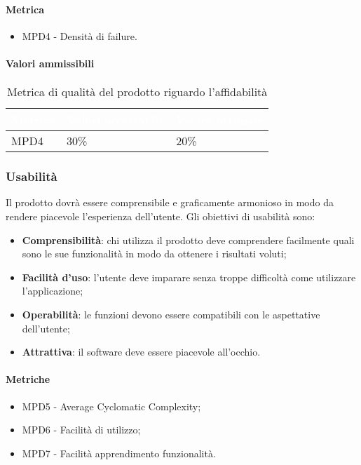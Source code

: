 \paragraph{Metrica}
\begin{itemize}
\item MPD4 - Densità di failure.
\end{itemize}
\paragraph{Valori ammissibili}
\renewcommand{\arraystretch}{1.5}
\begin{longtable}{C{2.5cm} C{4cm} C{4cm}}
\textcolor{white}{\textbf{Metrica}}&
\textcolor{white}{\textbf{Valori accettabile}}&
\textcolor{white}{\textbf{Valore ottimale}}\\	
\endhead
\endfoot
{}\caption{Metrica di qualità del prodotto riguardo l'affidabilità}
\endlastfoot
		MPD4 &  
		30\% &
		20\% \\
\end{longtable}
\subsubsection{Usabilità}
Il prodotto dovrà essere comprensibile e graficamente armonioso in modo da rendere piacevole l'esperienza dell'utente. Gli obiettivi di usabilità sono:
\begin{itemize}
\item \textbf{Comprensibilità}: chi utilizza il prodotto deve comprendere facilmente quali sono le sue funzionalità in modo da ottenere i risultati voluti;
\item \textbf{Facilità d'uso}: l'utente deve imparare senza troppe difficoltà come utilizzare l'applicazione;
\item \textbf{Operabilità}: le funzioni devono essere compatibili con le aspettative dell'utente;
\item \textbf{Attrattiva}: il software deve essere piacevole all'occhio.
\end{itemize} 
\paragraph{Metriche}
\begin{itemize}
\item MPD5 - Average Cyclomatic Complexity;
\item MPD6 - Facilità di utilizzo;
\item MPD7 - Facilità apprendimento funzionalità.
\end{itemize}
